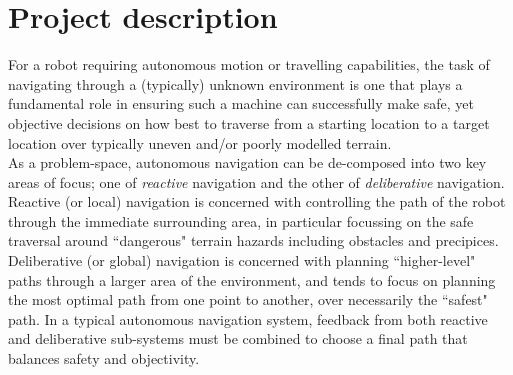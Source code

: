 \documentclass[10pt,fleqn,twoside]{article}
\begin{document}
\wordcount{}

\mmp

\setcounter{tocdepth}{3} %


\section{Project description}

For a robot requiring autonomous motion or travelling capabilities, the task of navigating through a (typically) unknown environment is one that plays a fundamental role in ensuring such a machine can successfully make safe, yet objective decisions on how best to traverse from a starting location to a target location over typically uneven and/or poorly modelled terrain. \\

As a problem-space, autonomous navigation can be de-composed into two key areas of focus; one of \textit{reactive} navigation and the other of \textit{deliberative} navigation. Reactive (or local) navigation is concerned with controlling the path of the robot through the immediate surrounding area, in particular focussing on the safe traversal around ``dangerous" terrain hazards including obstacles and precipices. Deliberative (or global) navigation is concerned with planning ``higher-level" paths through a larger area of the environment, and tends to focus on planning the most optimal path from one point to another, over necessarily the ``safest" path. In a typical autonomous navigation system, feedback from both reactive and deliberative sub-systems must be combined to choose a final path that balances safety and objectivity. \\
\end{document}
